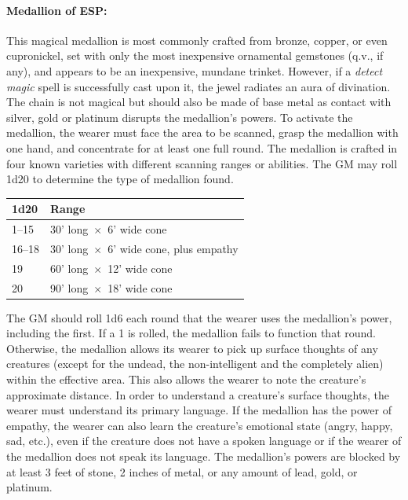 \begin{multicols}{2}
\paragraph{Medallion of ESP:} This magical medallion is most commonly crafted from bronze, copper, or even cupronickel, set with only the most inexpensive ornamental gemstones (q.v., if any), and appears to be an inexpensive, mundane trinket.  However, if a \textit{detect magic} spell is successfully cast upon it, the jewel radiates an aura of divination.  The chain is not magical but should also be made of base metal as contact with silver, gold or platinum disrupts the medallion's powers.  To activate the medallion, the wearer must face the area to be scanned, grasp the medallion with one hand, and concentrate for at least one full round.  The medallion is crafted in four known varieties with different scanning ranges or abilities.  The GM may roll 1d20 to determine the type of medallion found.

\noindent
\begin{tabular}{|p{}|p{}|}
\hline
1d20	& Range \\
\hline\hline
\rowcolor[gray]{.9}1--15	& 30' long~$\times$~6' wide cone \\
16--18	& 30' long~$\times$~6' wide cone, plus empathy \\
\rowcolor[gray]{.9}19	& 60' long~$\times$~12' wide cone \\
20	& 90' long~$\times$~18' wide cone \\
\hline
\end{tabular}

The GM should roll 1d6 each round that the wearer uses the medallion's power, including the first.  If a 1 is rolled, the medallion fails to function that round.  Otherwise, the medallion allows its wearer to pick up surface thoughts of any creatures (except for the undead, the non-intelligent and the completely alien) within the effective area.  This also allows the wearer to note the creature's approximate distance.  In order to understand a creature's surface thoughts, the wearer must understand its primary language.  If the medallion has the power of empathy, the wearer can also learn the creature's emotional state (angry, happy, sad, etc.), even if the creature does not have a spoken language or if the wearer of the medallion does not speak its language.  The medallion's powers are blocked by at least 3 feet of stone, 2 inches of metal, or any amount of lead, gold, or platinum.  


\end{multicols}
